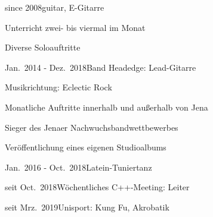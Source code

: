 \documentclass[a4paper,10pt]{cv}
\begin{document}
    \vspace{-1em}
    \begin{multicols}{2}
      \begin{cvTimeItem}{since 2008}{guitar, E-Gitarre}
        \begin{cvItemize}
          \item Unterricht zwei- bis viermal im Monat
          \item Diverse Soloauftritte
        \end{cvItemize}
      \end{cvTimeItem}
      \begin{cvTimeItem}{Jan.~2014 - Dez.~2018}{Band Headedge: Lead-Gitarre}
        \begin{cvItemize}
          \item Musikrichtung: Eclectic Rock
          \item Monatliche Auftritte innerhalb und außerhalb von Jena
          \item Sieger des Jenaer Nachwuchsbandwettbewerbes
          \item Veröffentlichung eines eigenen Studioalbums
        \end{cvItemize}
      \end{cvTimeItem}
      \begin{cvTimeItem}{Jan.~2016 - Oct.~2018}{Latein-Tuniertanz}
      \end{cvTimeItem}
      \begin{cvTimeItem}{seit Oct.~2018}{Wöchentliches C++-Meeting: Leiter}
      \end{cvTimeItem}
      \begin{cvTimeItem}{seit Mrz.~2019}{Unisport: Kung Fu, Akrobatik}
      \end{cvTimeItem}
    \end{multicols}
\end{document}

